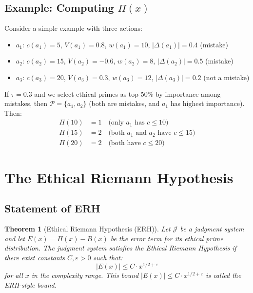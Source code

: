 \documentclass[12pt,a4paper]{article}
\newtheorem{theorem}{Theorem}[section]
\theoremstyle{definition}
\theoremstyle{remark}
\begin{document}
\subsection{Example: Computing \texorpdfstring{$\Pi(x)$}{Pi(x)}}

Consider a simple example with three actions:
\begin{itemize}
    \item $a_1$: $c(a_1) = 5$, $V(a_1) = 0.8$, $w(a_1) = 10$, $|\Delta(a_1)| = 0.4$ (mistake)
    \item $a_2$: $c(a_2) = 15$, $V(a_2) = -0.6$, $w(a_2) = 8$, $|\Delta(a_2)| = 0.5$ (mistake)
    \item $a_3$: $c(a_3) = 20$, $V(a_3) = 0.3$, $w(a_3) = 12$, $|\Delta(a_3)| = 0.2$ (not a mistake)
\end{itemize}

If $\tau = 0.3$ and we select ethical primes as top 50\% by importance among mistakes, then $\mathcal{P} = \{a_1, a_2\}$ (both are mistakes, and $a_1$ has highest importance). Then:
\begin{align*}
\Pi(10) &= 1 \quad \text{(only $a_1$ has $c \leq 10$)} \\
\Pi(15) &= 2 \quad \text{(both $a_1$ and $a_2$ have $c \leq 15$)} \\
\Pi(20) &= 2 \quad \text{(both have $c \leq 20$)}
\end{align*}

\section{The Ethical Riemann Hypothesis}
\label{sec:erh}

\subsection{Statement of ERH}

\begin{theorem}[Ethical Riemann Hypothesis (ERH)]
\label{thm:erh}
Let $\mathcal{J}$ be a judgment system and let $E(x) = \Pi(x) - B(x)$ be the error term for its ethical prime distribution. The judgment system satisfies the \emph{Ethical Riemann Hypothesis} if there exist constants $C, \varepsilon > 0$ such that:
\[
|E(x)| \leq C \cdot x^{1/2 + \varepsilon}
\]
for all $x$ in the complexity range. This bound $|E(x)| \leq C \cdot x^{1/2 + \varepsilon}$ is called the \emph{ERH-style bound}.
\end{theorem}
\end{document}
